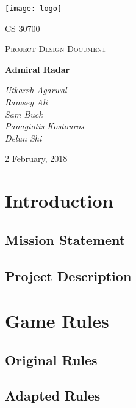 \documentclass[12pt]{article}
\begin{document}
\begin{titlepage}
	\centering
	\texttt{[image: logo]}\par\vspace{1cm}
	{\scshape\LARGE CS 30700 \par}
	{\scshape\Large Project Design Document\par}
	\vspace{1.5cm}
	{\Huge\bfseries Admiral Radar\par}
	\vspace{1.5cm}
	{\large\itshape Utkarsh Agarwal\\ Ramsey Ali \\ Sam Buck \\ Panagiotis Kostouros \\ Delun Shi \par}

	\vfill
	{\large 2 February, 2018 \par}
\end{titlepage}

\tableofcontents

\pagebreak

\section{Introduction}

\subsection{Mission Statement}


\subsection{Project Description}




\section{Game Rules}

\subsection{Original Rules}


\subsection{Adapted Rules}

\end{document}
